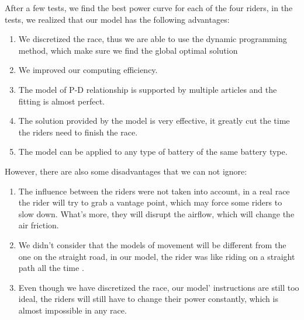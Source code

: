 \documentclass[12pt]{article}
\begin{document}
After a few tests, we find the best power curve for each of the four riders, in the tests, we realized that
our model has the following advantages:
\begin{enumerate}
    \item We discretized the race, thus we are able to use the dynamic programming method, which make sure we find the global optimal solution %
    \item We improved our computing efficiency.%
    \item The model of P-D relationship is supported by multiple articles and the fitting is almost perfect.
    \item The solution provided by the model is very effective, it greatly cut the time the riders need to finish the race.
    \item The model can be applied to any type of battery of the same battery type.
\end{enumerate}
However, there are also some disadvantages that we can not ignore:
\begin{enumerate}
    \item The influence between the riders were not taken into account, in a real race the rider will try to grab a vantage point, which may force some riders to 
    slow down. What's more, they will disrupt the airflow, which will change the air friction.%
    \item We didn't consider that the models of movement will be different from the one on the straight road, in our model, the rider was like riding on a straight path 
    all the time 
    .%
    \item Even though we have discretized the race, our model' instructions are still too ideal, the riders will still have to change their power constantly, which is 
    almost impossible in any race. %
\end{enumerate}
\end{document}
